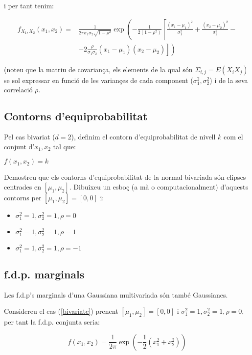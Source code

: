 \documentclass[10pt,a4paper]{article}
\begin{document}
i per tant tenim:

\begin{eqnarray}
f_{X_1, X_2}(x_1, x_2) =& \frac{1}{2\pi\sigma_1\sigma_2\sqrt{1 - \rho^2}}
\exp\left(-\frac{1}{2(1-\rho^2)}\left[\frac{(x_1 - \mu_1)^2}{\sigma_1^2} + \frac{(x_2 - \mu_2)^2}{\sigma_2^2}  - \right.\right.\\
& \left.\left.- 2 \frac{\rho}{\sigma_1\sigma_2}(x_1 - \mu_1) (x_2 - \mu_2)\right]\right)\nonumber
\end{eqnarray}

(noteu que la matriu de covariança, els elements de la qual són $\Sigma_{i,j} = E(X_i X_j)$ se sol expressar
en funció de les variançes de cada component ($\sigma_1^2,  \sigma_2^2$) i de la seva correlació $\rho$.

\subsection{Contorns d'equiprobabilitat}

Pel cas bivariat ($d=2$), definim el contorn d'equiprobabilitat de nivell $k$ com el conjunt d'$x_1, x_2$ tal que:

$f(x_1, x_2) = k$

Demostreu que els contorns d'equiprobabilitat de la normal bivariada són elipses 
centrades en $[\mu_1, \mu_2]$. Dibuixeu un esboç (a mà o computacionalment) d'aquests contorns per $[\mu_1, \mu_2] = [0,0]$ i:
\begin{itemize}
\item $\sigma_1^2 =1,  \sigma_2^2 =1 , \rho=0$
\item $\sigma_1^2 =1,  \sigma_2^2 =1 , \rho=1$
\item$\sigma_1^2 =1,  \sigma_2^2 =1 , \rho=-1$
\end{itemize}

\subsection{f.d.p. marginals}

Les f.d.p's marginals d'una Gaussiana multivariada són també Gaussianes. 

Considereu el cas (\ref{bivariate}) prenent $[\mu_1, \mu_2] = [0,0]$ i $\sigma_1^2 =1,  \sigma_2^2 =1 , \rho=0$, per tant la f.d.p. conjunta seria:

\begin{equation}
f(x_1, x_2) = \frac{1}{2\pi} \exp\left(-\frac{1}{2}\left(x_1^2 + x_2^2 \right)\right)
\end{equation}
\end{document}

